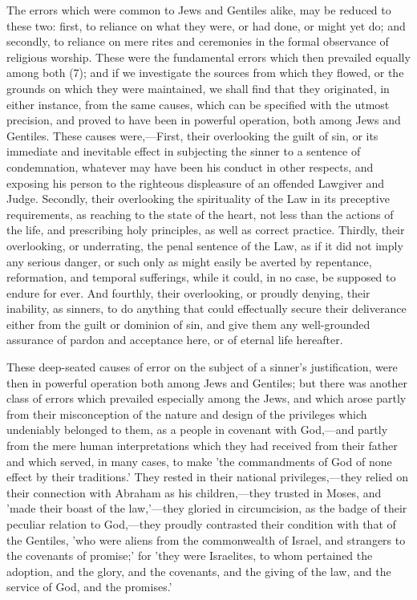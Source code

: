 \documentclass[
]{book}
\begin{document}
The errors which were common to Jews and Gentiles alike, may be reduced to these two: first, to reliance on what they were, or had done, or might yet do; and secondly, to reliance on mere rites and ceremonies in the formal observance of religious worship. These were the fundamental errors which then prevailed equally among both (7); and if we investigate the sources from which they flowed, or the grounds on which they were maintained, we shall find that they originated, in either instance, from the same causes, which can be specified with the utmost precision, and proved to have been in powerful operation, both among Jews and Gentiles. These causes were,---First, their overlooking the guilt of sin, or its immediate and inevitable effect in subjecting the sinner to a sentence of condemnation, whatever may have been his conduct in other respects, and exposing his person to the righteous displeasure of an offended Lawgiver and Judge. Secondly, their overlooking the spirituality of the Law in its preceptive requirements, as reaching to the state of the heart, not less than the actions of the life, and prescribing holy principles, as well as correct practice. Thirdly, their overlooking, or underrating, the penal sentence of the Law, as if it did not imply any serious danger, or such only as might easily be averted by repentance, reformation, and temporal sufferings, while it could, in no case, be supposed to endure for ever. And fourthly, their overlooking, or proudly denying, their inability, as sinners, to do anything that could effectually secure their deliverance either from the guilt or dominion of sin, and give them any well-grounded assurance of pardon and acceptance here, or of eternal life hereafter.

These deep-seated causes of error on the subject of a sinner's justification, were then in powerful operation both among Jews and Gentiles; but there was another class of errors which prevailed especially among the Jews, and which arose partly from their misconception of the nature and design of the privileges which undeniably belonged to them, as a people in covenant with God,---and partly from the mere human interpretations which they had received from their father and which served, in many cases, to make 'the commandments of God of none effect by their traditions.' They rested in their national privileges,---they relied on their connection with Abraham as his children,---they trusted in Moses, and 'made their boast of the law,'---they gloried in circumcision, as the badge of their peculiar relation to God,---they proudly contrasted their condition with that of the Gentiles, 'who were aliens from the commonwealth of Israel, and strangers to the covenants of promise;' for 'they were Israelites, to whom pertained the adoption, and the glory, and the covenants, and the giving of the law, and the service of God, and the promises.'
\end{document}
